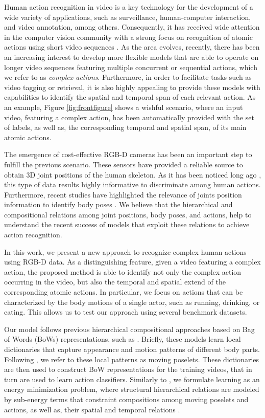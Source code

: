 Human action recognition in video is a key technology for the development of a
wide variety of applications, such as surveillance, human-computer interaction,
and video annotation, among others. Consequently, it has received wide attention
in the computer vision community with a strong focus on recognition of atomic
actions using short video sequences
\cite{Aggarwal2011,vishwakarma2013survey,weinland2011survey}. As the area
evolves, recently, there has been an increasing interest to develop more
flexible models that are able to operate on longer video sequences featuring
multiple concurrent or sequential actions, which we refer to as
\textit{complex actions}. Furthermore, in order to facilitate tasks such as
video tagging or retrieval, it is also highly appealing to provide these models
with capabilities to identify the spatial and temporal span of each relevant
action. As an example, Figure \ref{fig:frontfigure} shows a wishful scenario,
where an input video, featuring a complex action, has been automatically
provided with the set of labels, as well as, the corresponding temporal and
spatial span, of its main atomic actions.

The emergence of cost-effective RGB-D cameras \cite{} has been an important step
to fulfill the previous scenario. These sensors have provided a reliable source
to obtain 3D joint positions of the human skeleton. As it has been noticed long
ago \cite{Johansson73}, this type of data results highly informative to
discriminate among human actions. Furthermore, recent studies have
highlighted the relevance of joints position information to identify body poses
\cite{Jhuang2013,Wang2013}. We believe that the hierarchical and compositional
relations among joint positions, body poses, and actions, help to understand the
recent success of models that exploit these relations to achieve action
recognition.

In this work, we present a new approach to recognize
complex human actions using RGB-D data. As a distinguishing feature,
given a video featuring a complex action, the
proposed method is able to identify not only the complex action occurring in the
video, but also the temporal and spatial extend of the corresponding atomic
actions. In particular, we focus on actions that can be characterized by the
body motions of a single actor, such as running, drinking, or eating. This
allows us to test our approach using several benchmark datasets.

Our model follows previous hierarchical compositional approaches based on Bag
of Words (BoWs) representations, such as \cite{Wang2013, Lillo2014,
de la torre,Tao2015}.
Briefly, these models learn local dictionaries that capture
appearance and motion patterns of different body parts. Following
\cite{Tao2015}, we refer to these local patterns as moving poselets. These
dictionaries are then used to construct BoW representations for the training
videos, that in turn are used to learn action classifiers. Similarly to
\cite{Lillo2014, Tao2015}, we formulate learning as an energy minimization
problem, where structural hierarchical relations are modeled by sub-energy
terms that constraint compositions among
moving poselets and actions, as well as, their spatial and temporal relations
\cite{Lillo2014}.

